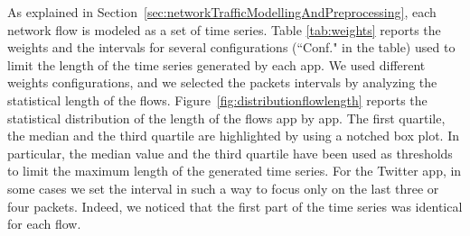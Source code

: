 \documentclass{acm_proc_article-sp}
\begin{document}
As explained in Section~\ref{sec:networkTrafficModellingAndPreprocessing}, 
each network flow is modeled as a set of time series. 
Table \ref{tab:weights} reports the weights and the intervals for several configurations (``Conf." in the table) used to limit the length of the time series generated by each app.
We used different weights configurations, and we selected the packets
intervals by analyzing the statistical length of the flows. 
Figure~\ref{fig:distributionflowlength} reports the
statistical distribution of the length of the flows app by app. 
The first quartile, the median and the third quartile are highlighted by 
using a notched box plot. In particular, the median value and the third quartile have been used 
as thresholds to limit the maximum length of the generated time series. 
For the Twitter app, in some cases we set the interval in such a way to focus 
only on the last three or four packets.
Indeed, we noticed that the first part of the time series was identical for each flow.
\end{document}
